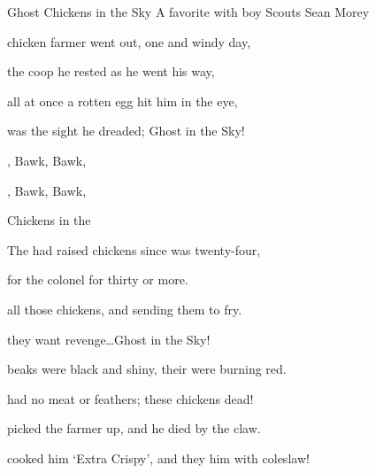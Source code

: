 \begin{SBSong}{Ghost Chickens in the Sky}
  {A favorite with boy Scouts}
  {Sean Morey}
  \begin{SBVerse}
	 chicken farmer went out, one  and windy day,

	 the coop he rested as he went  his way,

	 all at once a rotten egg hit him in the eye,

	 was the sight he dreaded; Ghost  in the Sky!
  \end{SBVerse}
  \begin{SBChorus}
	, Bawk, Bawk, 

	, Bawk, Bawk, 

	 Chickens in the 
  \end{SBChorus}
  \begin{SBVerse}
    The   had raised chickens since  was twenty-four,

	 for the colonel for thirty  or more.

	 all those chickens, and sending them to fry.

	 they want revenge\ldots Ghost  in the Sky!
  \end{SBVerse}
  \begin{SBVerse}
	 beaks were black and shiny, their  were burning red.

	 had no meat or feathers; these chickens  dead!

	 picked the farmer up, and he died by the claw.

	 cooked him `Extra Crispy', and they  him with coleslaw!
  \end{SBVerse}
\end{SBSong}
